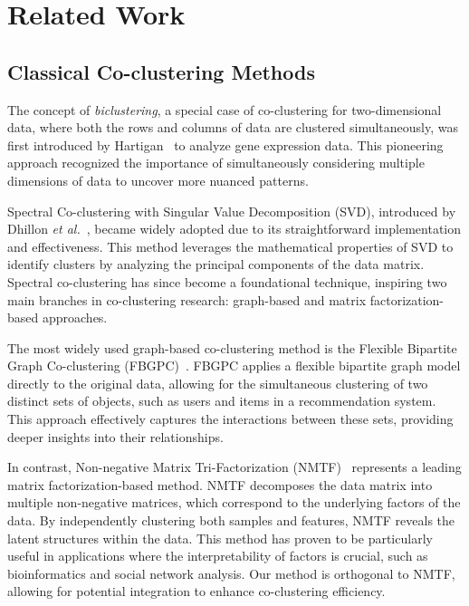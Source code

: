 \documentclass[journal]{IEEEtran}
\renewcommand{\cite}[1]{~\autocite{#1}}
\begin{document}
\section{Related Work}
\label{sec:related_work}
\subsection{Classical Co-clustering Methods}
The concept of \emph{biclustering}, a special case of co-clustering for two-dimensional data, where both the rows and columns of data are clustered simultaneously, was first introduced by Hartigan\cite{hartigan1972DirectClusteringData} to analyze gene expression data. This pioneering approach recognized the importance of simultaneously considering multiple dimensions of data to uncover more nuanced patterns.

Spectral Co-clustering with Singular Value Decomposition (SVD), introduced by Dhillon \textit{et al.}\cite{dhillon2001CoclusteringDocumentsWords}, became widely adopted due to its straightforward implementation and effectiveness. This method leverages the mathematical properties of SVD to identify clusters by analyzing the principal components of the data matrix. Spectral co-clustering has since become a foundational technique, inspiring two main branches in co-clustering research: graph-based and matrix factorization-based approaches.

The most widely used graph-based co-clustering method is the Flexible Bipartite Graph Co-clustering (FBGPC)\cite{chen2023FastFlexibleBipartitea}. FBGPC applies a flexible bipartite graph model directly to the original data, allowing for the simultaneous clustering of two distinct sets of objects, such as users and items in a recommendation system. This approach effectively captures the interactions between these sets, providing deeper insights into their relationships.

In contrast, Non-negative Matrix Tri-Factorization (NMTF)\cite{long2005CoclusteringBlockValue} represents a leading matrix factorization-based method. NMTF decomposes the data matrix into multiple non-negative matrices, which correspond to the underlying factors of the data. By independently clustering both samples and features, NMTF reveals the latent structures within the data. This method has proven to be particularly useful in applications where the interpretability of factors is crucial, such as bioinformatics and social network analysis. Our method is orthogonal to NMTF, allowing for potential integration to enhance co-clustering efficiency.
\end{document}
